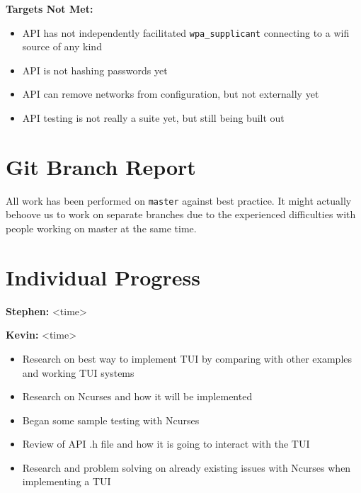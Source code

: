 \documentclass[11pt]{article}
\begin{document}
\textbf{Targets Not Met:}
\begin{itemize}
  \item API has not independently facilitated \texttt{wpa\_supplicant} connecting to a wifi source of any kind
  \item API is not hashing passwords yet
  \item API can remove networks from configuration, but not externally yet
  \item API testing is not really a suite yet, but still being built out
\end{itemize}


\section{Git Branch Report}
All work has been performed on \texttt{master} against best practice. It might actually behoove us to
work on separate branches due to the experienced difficulties with people working on master at the same
time.


\section{Individual Progress}

\textbf{Stephen:} <time>
\begin{itemize}

\end{itemize}


\textbf{Kevin:} <time>
\begin{itemize}
  \item Research on best way to implement TUI by comparing with other examples and working TUI systems
  \item Research on Ncurses and how it will be implemented 
  \item Began some sample testing with Ncurses 
  \item Review of API .h file and how it is going to interact with the TUI
  \item Research and problem solving on already existing issues with Ncurses when implementing a TUI
\end{itemize}
\end{document}
